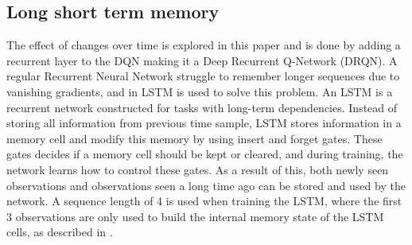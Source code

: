 \subsection{Long short term memory}
The effect of changes over time is explored in this paper and is done by adding a recurrent layer to the DQN making it a Deep Recurrent Q-Network (DRQN). A regular Recurrent Neural Network struggle to remember longer sequences due to vanishing gradients, and in \cite{Hochreiter1997LONGMEMORY} LSTM is used to solve this problem. 
An LSTM is a recurrent network constructed for tasks with long-term dependencies. Instead of storing all information from previous time sample, LSTM stores information in a memory cell and modify this memory by using insert and forget gates. These gates decides if a memory cell should be kept or cleared, and during training, the network learns how to control these gates. As a result of this, both newly seen observations and observations seen a long time ago can be stored and used by the network. A sequence length of 4 is used when training the LSTM, where the first 3 observations are only used to build the internal memory state of the LSTM cells, as described in \cite{LamplePlayingLearning}.


